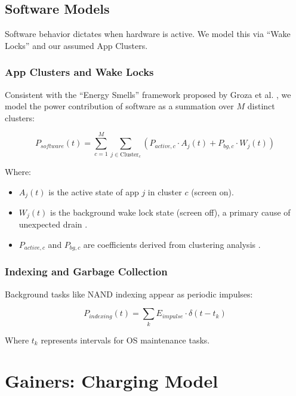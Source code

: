\documentclass[12pt]{article}
\begin{document}
\subsection{Software Models}

Software behavior dictates when hardware is active. We model this via ``Wake Locks'' and our assumed App Clusters.

\subsubsection{App Clusters and Wake Locks}

Consistent with the ``Energy Smells'' framework proposed by Groza et al. \cite{10}, we model the power contribution of software as a summation over $M$ distinct clusters:

\begin{equation} \label{eq:software_power}
P_{software}(t) = \sum_{c=1}^{M} \sum_{j \in \text{Cluster}_c} \left( P_{active,c} \cdot A_j(t) + P_{bg,c} \cdot W_j(t) \right)
\end{equation}

Where:
\begin{itemize}
    \item $A_j(t)$ is the active state of app $j$ in cluster $c$ (screen on).
    \item $W_j(t)$ is the background wake lock state (screen off), a primary cause of unexpected drain \cite{10}.
    \item $P_{active,c}$ and $P_{bg,c}$ are coefficients derived from clustering analysis \cite{12}.
\end{itemize}

\subsubsection{Indexing and Garbage Collection}

Background tasks like NAND indexing appear as periodic impulses:

\begin{equation} \label{eq:indexing_power}
P_{indexing}(t) = \sum_{k} E_{impulse} \cdot \delta(t - t_k)
\end{equation}

Where $t_k$ represents intervals for OS maintenance tasks.

\section{Gainers: Charging Model}
\end{document}
